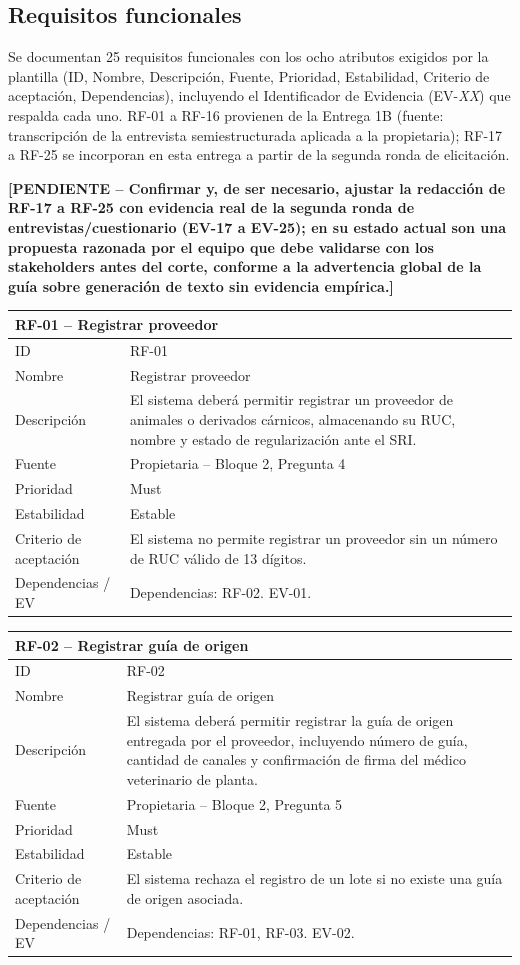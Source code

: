 \documentclass[11pt,a4paper]{article}
\newcommand{\PENDIENTE}[1]{\textcolor{pendiente}{\textbf{[PENDIENTE -- #1]}}}
\begin{document}
\subsection{Requisitos funcionales}
Se documentan 25 requisitos funcionales con los ocho atributos exigidos por la plantilla (ID, Nombre, Descripción, Fuente, Prioridad, Estabilidad, Criterio de aceptación, Dependencias), incluyendo el Identificador de Evidencia (EV-\textit{XX}) que respalda cada uno. RF-01 a RF-16 provienen de la Entrega 1B (fuente: transcripción de la entrevista semiestructurada aplicada a la propietaria); RF-17 a RF-25 se incorporan en esta entrega a partir de la segunda ronda de elicitación.

\PENDIENTE{Confirmar y, de ser necesario, ajustar la redacción de RF-17 a RF-25 con evidencia real de la segunda ronda de entrevistas/cuestionario (EV-17 a EV-25); en su estado actual son una propuesta razonada por el equipo que debe validarse con los stakeholders antes del corte, conforme a la advertencia global de la guía sobre generación de texto sin evidencia empírica.}

\newcommand{\rfitem}[8]{%
\begin{longtable}{|p{2.4cm}|p{11.2cm}|}
\hline
\multicolumn{2}{|l|}{\textbf{#1 -- #2}} \\
\hline
ID & #1 \\
\hline
Nombre & #2 \\
\hline
Descripción & #3 \\
\hline
Fuente & #4 \\
\hline
Prioridad & #5 \\
\hline
Estabilidad & #6 \\
\hline
Criterio de aceptación & #7 \\
\hline
Dependencias / EV & #8 \\
\hline
\end{longtable}
\vspace{-0.4cm}
}

\rfitem{RF-01}{Registrar proveedor}{El sistema deberá permitir registrar un proveedor de animales o derivados cárnicos, almacenando su RUC, nombre y estado de regularización ante el SRI.}{Propietaria -- Bloque 2, Pregunta 4}{Must}{Estable}{El sistema no permite registrar un proveedor sin un número de RUC válido de 13 dígitos.}{Dependencias: RF-02. EV-01.}

\rfitem{RF-02}{Registrar guía de origen}{El sistema deberá permitir registrar la guía de origen entregada por el proveedor, incluyendo número de guía, cantidad de canales y confirmación de firma del médico veterinario de planta.}{Propietaria -- Bloque 2, Pregunta 5}{Must}{Estable}{El sistema rechaza el registro de un lote si no existe una guía de origen asociada.}{Dependencias: RF-01, RF-03. EV-02.}
\end{document}
